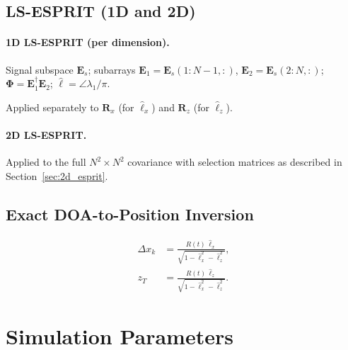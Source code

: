 \documentclass[11pt,a4paper]{article}
\begin{document}
\subsection{LS-ESPRIT (1D and 2D)}
\label{sec:esprit}

\paragraph{1D LS-ESPRIT (per dimension).}
Signal subspace $\mathbf{E}_s$; subarrays
$\mathbf{E}_1=\mathbf{E}_s(1{:}N{-}1,:)$,
$\mathbf{E}_2=\mathbf{E}_s(2{:}N,:)$;
$\bm{\Phi}=\mathbf{E}_1^\dagger\mathbf{E}_2$;
$\hat{\ell}=\angle\lambda_1/\pi$.

Applied separately to $\mathbf{R}_x$ (for $\hat{\ell}_x$) and
$\mathbf{R}_z$ (for $\hat{\ell}_z$).

\paragraph{2D LS-ESPRIT.}
Applied to the full $N^2\times N^2$ covariance with selection
matrices as described in Section~\ref{sec:2d_esprit}.

\subsection{Exact DOA-to-Position Inversion}
\begin{align}
  \Delta x_k &= \frac{R(t)\,\hat{\ell}_x}
  {\sqrt{1-\hat{\ell}_x^2-\hat{\ell}_z^2}},
  \label{eq:exact_inv_x}\\
  z_T &= \frac{R(t)\,\hat{\ell}_z}
  {\sqrt{1-\hat{\ell}_x^2-\hat{\ell}_z^2}}.
  \label{eq:exact_inv_z}
\end{align}

\section{Simulation Parameters}
\label{sec:params}
\end{document}
